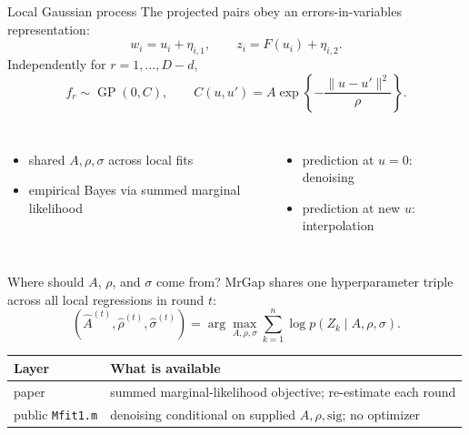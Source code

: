 \documentclass[aspectratio=169,10pt]{beamer}
\begin{document}
\begin{frame}{Local Gaussian process}
  The projected pairs obey an errors-in-variables representation:
  \[
    w_i=u_i+\eta_{i,1},\qquad
    z_i=F(u_i)+\eta_{i,2}.
  \]
  Independently for \(r=1,\ldots,D-d\),
  \[
    f_r\sim\operatorname{GP}(0,C),\qquad
    C(u,u')=A\exp\!\left\{-\frac{\|u-u'\|^2}{\rho}\right\}.
  \]
  \begin{columns}[T]
      \begin{itemize}
        \item shared \(A,\rho,\sigma\) across local fits
        \item empirical Bayes via summed marginal likelihood
      \end{itemize}
      \begin{itemize}
        \item prediction at \(u=0\): denoising
        \item prediction at new \(u\): interpolation
      \end{itemize}
  \end{columns}
\end{frame}

\begin{frame}{Where should $A$, $\rho$, and $\sigma$ come from?}
  MrGap shares one hyperparameter triple across all local regressions in round $t$:
  \[
    (\widehat A^{(t)},\widehat\rho^{(t)},\widehat\sigma^{(t)})
      =\arg\max_{A,\rho,\sigma}
        \sum_{k=1}^{n}\log p(Z_k\mid A,\rho,\sigma).
  \]
  \begin{center}
    \small
    \begin{tabular}{p{}p{}}
      \toprule
      Layer & What is available\\
      \midrule
      paper & summed marginal-likelihood objective; re-estimate each round\\
      public \texttt{Mfit1.m} & denoising conditional on supplied $A,\rho,\mathrm{sig}$; no optimizer\\
      \bottomrule
    \end{tabular}
  \end{center}
\end{frame}
\end{document}
